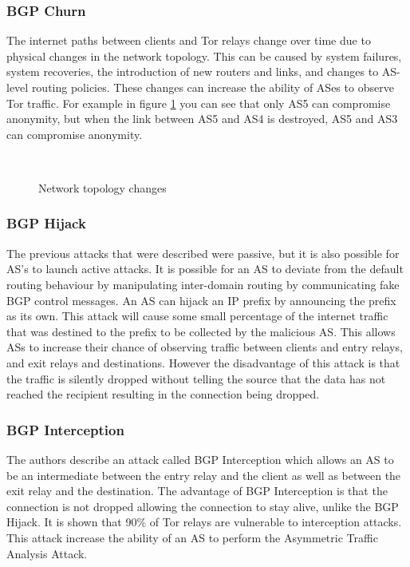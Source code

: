 \documentclass[9pt,technote]{IEEEtran}
\begin{document}
\subsubsection{BGP Churn}
The internet paths between clients and Tor relays change over time due to
physical changes in the network topology. This can be caused by system failures,
system recoveries, the introduction of new routers and links, and changes to
AS-level routing policies. These changes can increase the ability of ASes to
observe Tor traffic. For example in figure \ref{fig:as-churn} you can see that
only AS5 can compromise anonymity, but when the link between AS5 and AS4 is
destroyed, AS5 and AS3 can compromise anonymity.
\begin{figure}[h!]
\centering
{}
~~
\label{fig:as-churn}
\caption{Network topology changes \cite{sun2015raptor}}
\end{figure}
\subsubsection{BGP Hijack}
The previous attacks that were described were passive, but it is also possible
for AS's to launch active attacks. It is possible for an AS to deviate from the
default routing behaviour by manipulating inter-domain routing by communicating
fake BGP control messages. An AS can hijack an IP prefix by announcing the
prefix as its own. This attack will cause some small percentage of the internet
traffic that was destined to the prefix to be collected by the malicious AS.
This allows ASs to increase their chance of observing traffic between clients
and entry relays, and exit relays and destinations. However the disadvantage of
this attack is that the traffic is silently dropped without telling the source
that the data has not reached the recipient resulting in the connection being
dropped.
\subsubsection{BGP Interception}
The authors describe an attack called BGP Interception which allows an AS to be
an intermediate between the entry relay and the client as well as between the
exit relay and the destination. The advantage of BGP Interception is that the
connection is not dropped allowing the connection to stay alive, unlike the BGP
Hijack. It is shown that 90\% of Tor relays are vulnerable to interception
attacks. This attack increase the ability of an AS to perform the Asymmetric
Traffic Analysis Attack. 
\end{document}
